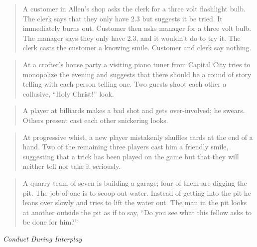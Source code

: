 \documentclass[twoside,symmetric,nobib,justified]{tufte-book}
\begin{document}
\begin{quote}
A customer in Allen's shop asks the clerk for a three volt flashlight
bulb. The clerk says that they only have 2.3 but suggests it be tried.
It immediately burns out. Customer then asks manager for a three volt
bulb. The manager says they only have 2.3, and it wouldn't do to try it.
The clerk casts the customer a knowing smile. Customer and clerk say
nothing.
\end{quote}

\begin{quote}
At a crofter's house party a visiting piano tuner from Capital City
tries to monopolize the evening and suggests that there should be a
round of story telling with each person telling one. Two guests shoot
each other a collusive, ``Holy Christ!'' look.
\end{quote}

\begin{quote}
A player at billiards makes a bad shot and gets over-involved; he
swears. Others present cast each other snickering looks.
\end{quote}

\begin{quote}
At progressive whist, a new player mistakenly shuffles cards at the end
of a hand. Two of the remaining three players cast him a friendly smile,
suggesting that a trick has been played on the game but that they will
neither tell nor take it seriously.
\end{quote}

\begin{quote}
A quarry team of seven is building a garage; four of them are digging
the pit. The job of one is to scoop out water. Instead of getting into
the pit he leans over slowly and tries to lift the water out. The man in
the pit looks at another outside the pit as if to say, ``Do you see what
this fellow asks to be done for him?''
\end{quote}

\newpage
\thispagestyle{plain} %
\mbox{}


\newpage
\thispagestyle{empty}
\begin{fullwidth}

\begin{center}
\vspace*{3in}

{\fontsize{35}{24}\selectfont{Part Five}\par}

\vspace{1in}

{\fontsize{35}{24}\selectfont\textit{Conduct During Interplay}\par}

\end{center}

\end{fullwidth}
\end{document}

